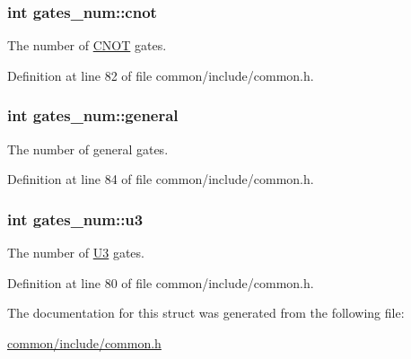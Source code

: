\subsubsection[{\texorpdfstring{cnot}{cnot}}]{\setlength{\rightskip}{0pt plus 5cm}int gates\+\_\+num\+::cnot}\hypertarget{structgates__num_abcf819b25f7319deb68b22ef23dd109e}{}\label{structgates__num_abcf819b25f7319deb68b22ef23dd109e}


The number of \hyperlink{class_c_n_o_t}{C\+N\+OT} gates. 



Definition at line 82 of file common/include/common.\+h.

\subsubsection[{\texorpdfstring{general}{general}}]{\setlength{\rightskip}{0pt plus 5cm}int gates\+\_\+num\+::general}\hypertarget{structgates__num_aed89b33df39ec82ae7f620c944d66846}{}\label{structgates__num_aed89b33df39ec82ae7f620c944d66846}


The number of general gates. 



Definition at line 84 of file common/include/common.\+h.

\subsubsection[{\texorpdfstring{u3}{u3}}]{\setlength{\rightskip}{0pt plus 5cm}int gates\+\_\+num\+::u3}\hypertarget{structgates__num_a4a2b09456d5676e18d441cff35f375d9}{}\label{structgates__num_a4a2b09456d5676e18d441cff35f375d9}


The number of \hyperlink{class_u3}{U3} gates. 



Definition at line 80 of file common/include/common.\+h.



The documentation for this struct was generated from the following file\+:\begin{DoxyCompactItemize}
\item 
\hyperlink{common_2include_2common_8h}{common/include/common.\+h}\end{DoxyCompactItemize}
